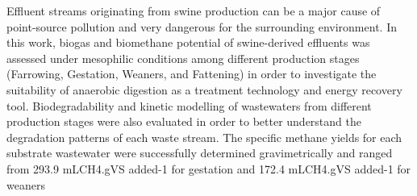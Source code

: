 Effluent streams originating from swine production can be a major cause of point-source pollution and very dangerous for the surrounding environment. In this work, biogas and biomethane potential of swine-derived effluents was assessed under mesophilic conditions among different production stages (Farrowing, Gestation, Weaners, and Fattening) in order to investigate the suitability of anaerobic digestion as a treatment technology and energy recovery tool. Biodegradability and kinetic modelling of wastewaters from different production stages were also evaluated in order to better understand the degradation patterns of each waste stream. The specific methane yields for each substrate wastewater were successfully determined gravimetrically and ranged from 293.9 mLCH4.gVS added-1 for gestation and 172.4 mLCH4.gVS added-1 for weaners